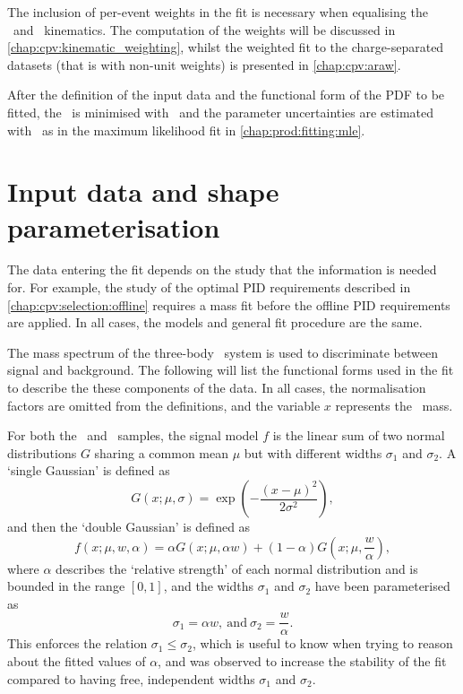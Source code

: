 The inclusion of per-event weights in the fit is necessary when equalising the 
\pKK\ and \ppipi\ kinematics.
The computation of the weights will be discussed in 
\cref{chap:cpv:kinematic_weighting}, whilst the weighted fit to the 
charge-separated datasets (that is with non-unit weights) is presented in 
\cref{chap:cpv:araw}.

After the definition of the input data and the functional form of the \ac{PDF} 
to be fitted, the \chisq\ is minimised with \minuit\ and the parameter 
uncertainties are estimated with \hesse\ as in the maximum likelihood fit in 
\cref{chap:prod:fitting:mle}.

\section{Input data and shape parameterisation}
\label{chap:cpv:prelim_fits:data_pdfs}

The data entering the fit depends on the study that the information is needed 
for.
For example, the study of the optimal \ac{PID} requirements described in 
\cref{chap:cpv:selection:offline} requires a mass fit before the offline 
\ac{PID} requirements are applied.
In all cases, the models and general fit procedure are the same.

The mass spectrum of the three-body \phh\ system is used to discriminate 
between signal and background.
The following will list the functional forms used in the fit to describe the 
these components of the data.
In all cases, the normalisation factors are omitted from the definitions, and 
the variable $x$ represents the \PLambdac\ mass.

For both the \pKK\ and \ppipi\ samples, the signal model $f$ is the linear sum 
of two normal distributions $G$ sharing a common mean $\mu$ but with different 
widths $\sigma_{1}$ and $\sigma_{2}$.
A `single Gaussian' is defined as
\begin{equation}
  G(x; \mu, \sigma) = \exp\left(-\frac{{(x - \mu)}^{2}}{2\sigma^{2}}\right),
\end{equation}
and then the `double Gaussian' is defined as
\begin{equation}
  f(x; \mu, w, \alpha) = \alpha{}G(x; \mu, \alpha{w}) +
    (1 - \alpha)G(x; \mu, \frac{w}{\alpha}),
  \label{eqn:cpv:prelim_fits:sig_model}
\end{equation}
where $\alpha$ describes the `relative strength' of each normal distribution 
and is bounded in the range $[0, 1]$, and the widths $\sigma_{1}$ and 
$\sigma_{2}$ have been parameterised as
\begin{equation}
  \sigma_{1} = \alpha{w},\ \text{and}\ \sigma_{2} = \frac{w}{\alpha}.
  \label{eqn:cpv:prelim_fits:sigma_def}
\end{equation}
This enforces the relation $\sigma_{1} \leq \sigma_{2}$, which is useful to 
know when trying to reason about the fitted values of $\alpha$, and was 
observed to increase the stability of the fit compared to having free, 
independent widths $\sigma_{1}$ and $\sigma_{2}$.

